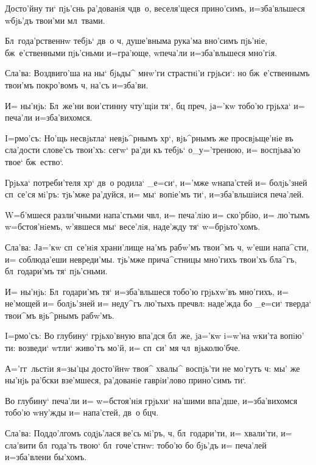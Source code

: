 Досто'йну ти` пjь'снь ра'дованiя ч дв~о, 
веселя'щеся прино'симъ, и=зба'вльшеся w\т бjь'дъ твои'ми 
мл~твами.

Бл~года'рственнw тебjь` дв~о ч, душе'вныма 
рука'ма вно'симъ пjь'нiе, бж~е'ственными пjь'сньми 
и=гра'юще, w\т печа'ли и=зба'вльшеся мно'гiя.

Сла'ва: Воздвиго'ша на ны` бjьды^ мнw'ги страстнi'и 
грjьси`: но бж~е'ственнымъ твои'мъ покро'вомъ ч, 
на'съ и=зба'ви.

И= ны'нjь: Бл~же'ни вои'стинну чту'щiи тя`, бц 
преч, jа='кw тобо'ю грjьха` и= печа'ли 
и=зба'вихомся.


I=рмо'съ: Но'щь несвjьтла` невjь^рнымъ хр`, 
вjь^рнымъ же просвjьще'нiе въ сла'дости слове'съ твои'хъ: 
сегw` ра'ди къ тебjь` о_у='тренюю, и= воспjьва'ю твое` 
бж~ество`.

Грjьха` потреби'теля хр` дв~о родила` _е=си`, 
и='мже w\т напа'стей и= болjь'зней сп~се'ся мi'ръ: 
тjь'мже ра'дуйся, и= мы` вопiе'мъ ти`, и=зба'вльшiися 
печа'лей.

W=б'мшеся разли'чными напа'стьми ч вл, и= 
печа'лiю и= ско'рбiю, и= лю'тымъ w=бстоя'нiемъ, 
w'явшеся мы` весе'лiя, наде'жду тя` w=брjьто'хомъ.

Сла'ва: Jа='кw сп~се'нiя храни'лище на'мъ рабw'мъ 
твои^мъ ч, w'еши напа^сти, и= соблюда'еши 
невреди'мы. тjь'мже прича^стницы мно'гихъ твои'хъ бла^гъ, 
бл~годари'мъ тя` пjь'сньми.

И= ны'нjь: Бл~годари'мъ тя` и=зба'вльшеся тобо'ю 
грjьхw'въ мно'гихъ, и= не'мощей и= болjь'зней и= неду^гъ 
лю'тыхъ преч вл: наде'жда бо _е=си` тверда` 
твои^мъ вjь^рнымъ рабw'мъ.


I=рмо'съ: Во глубину` грjьхо'вную впа'дся бл~же, 
jа='кw i=w'на w\т ки'та вопiю' ти: возведи` w\т тли` 
живо'тъ мо'й, и= сп~си' мя чл~вjьколю'бче.

А='гг~льстiи я=зы'цы досто'йнw твоя^ хвалы^ воспjь'ти 
не мо'гутъ ч: мы' же ны'нjь ра'бски взе'мшеся, 
ра'дованiе гаврiи'лово прино'симъ ти`.

Во глубину` печа'ли и= w=бстоя'нiя грjьхи` на'шими 
впа'дше, и=зба'вихомся тобо'ю w\т ну'жды и= напа'стей, 
дв~о бц ч.

Сла'ва: Под\ъ до'лгомъ содjь'лася ве'сь мi'ръ, ч, 
бл~годари'ти, и= хвали'ти, и= сла'вити бл~года'ть твою` 
бл~гоче'стнw: тобо'ю бо бjь'дъ и= печа'лей и=зба'влени 
бы'хомъ.

